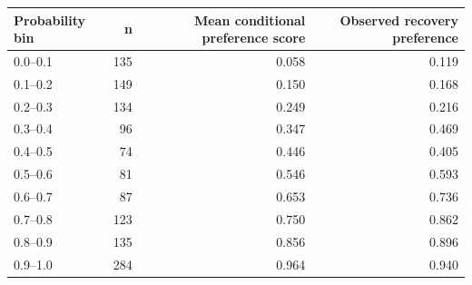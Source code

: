 \begin{tabular}{lrrr}
\toprule
Probability bin & n & Mean conditional preference score & Observed recovery preference \\
\midrule
0.0--0.1 & 135 & 0.058 & 0.119 \\
0.1--0.2 & 149 & 0.150 & 0.168 \\
0.2--0.3 & 134 & 0.249 & 0.216 \\
0.3--0.4 & 96 & 0.347 & 0.469 \\
0.4--0.5 & 74 & 0.446 & 0.405 \\
0.5--0.6 & 81 & 0.546 & 0.593 \\
0.6--0.7 & 87 & 0.653 & 0.736 \\
0.7--0.8 & 123 & 0.750 & 0.862 \\
0.8--0.9 & 135 & 0.856 & 0.896 \\
0.9--1.0 & 284 & 0.964 & 0.940 \\
\bottomrule
\end{tabular}
